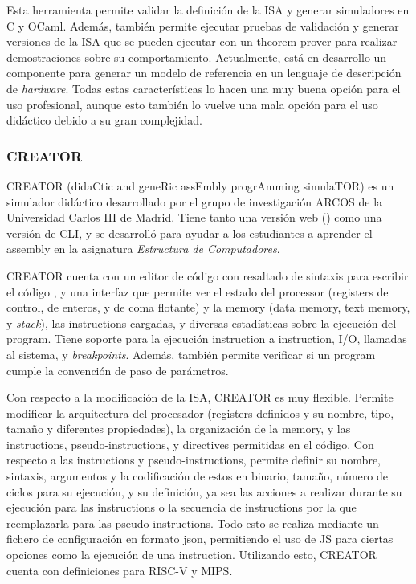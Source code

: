 Esta herramienta permite validar la definición de la \gls{ISA} y generar
simuladores en C y OCaml. Además, también permite ejecutar pruebas de validación
y generar versiones de la \gls{ISA} que se pueden ejecutar con un \gls{theorem
prover} para realizar demostraciones sobre su comportamiento. Actualmente, está
en desarrollo un componente para generar un modelo de referencia en un lenguaje
de descripción de \textit{hardware}. Todas estas características lo hacen una
muy buena opción para el uso profesional, aunque esto también lo vuelve una mala
opción para el uso didáctico debido a su gran complejidad.

\subsubsection{CREATOR}

CREATOR (didaCtic and geneRic assEmbly progrAmming simulaTOR)
\parencite{CREATOR} es un simulador didáctico desarrollado por el grupo de
investigación ARCOS de la Universidad Carlos III de Madrid. Tiene tanto una
versión web () como una versión de \gls{CLI}, y se desarrolló
para ayudar a los estudiantes a aprender el \gls{assembly} en la asignatura
\textit{Estructura de Computadores}.

CREATOR cuenta con un editor de código con resaltado de sintaxis para escribir
el código , y una interfaz que permite ver el
estado del \gls{processor} (\glspl{register} de control, de enteros, y de coma
flotante) y la \gls{memory} (\gls{data memory}, \gls{text memory}, y
\textit{stack}), las \glspl{instruction} cargadas, y diversas estadísticas sobre
la ejecución del \gls{program}. Tiene soporte para la ejecución
\gls{instruction} a \gls{instruction}, I/O, llamadas al sistema, y
\textit{breakpoints}. Además, también permite verificar si un \gls{program}
cumple la convención de paso de parámetros.

Con respecto a la modificación de la \gls{ISA}, CREATOR es muy flexible. Permite
modificar la arquitectura del procesador (\glspl{register} definidos y su
nombre, tipo, tamaño y diferentes propiedades), la organización de la
\gls{memory}, y las \glspl{instruction}, \glspl{pseudo-instruction}, y
\glspl{directive} permitidas en el código. Con respecto a las \glspl{instruction}
y \glspl{pseudo-instruction}, permite definir su nombre, sintaxis, argumentos y
la codificación de estos en binario, tamaño, número de ciclos para su ejecución,
y su definición, ya sea las acciones a realizar durante su ejecución para las
\glspl{instruction} o la secuencia de \glspl{instruction} por la que
reemplazarla para las \glspl{pseudo-instruction}. Todo esto se realiza mediante
un fichero de configuración en formato \gls{json}, permitiendo el uso de
\gls{JS} para ciertas opciones como la ejecución de una \gls{instruction}.
Utilizando esto, CREATOR cuenta con definiciones para RISC-V y MIPS.

